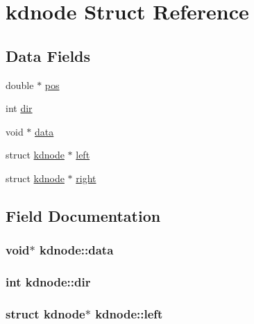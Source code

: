 \hypertarget{structkdnode}{}\section{kdnode Struct Reference}
\label{structkdnode}
\subsection*{Data Fields}
\begin{DoxyCompactItemize}
\item 
double $\ast$ \hyperlink{structkdnode_af92e7d95a2845d3e8611b289d6398a83}{pos}
\item 
int \hyperlink{structkdnode_aa3b02f2e7995f08cd16a85ea93e1fc80}{dir}
\item 
void $\ast$ \hyperlink{structkdnode_ac14038f51e15cb1bb26abe6558d36a3d}{data}
\item 
struct \hyperlink{structkdnode}{kdnode} $\ast$ \hyperlink{structkdnode_a5011f2e53a829b362c8d034f005e6a04}{left}
\item 
struct \hyperlink{structkdnode}{kdnode} $\ast$ \hyperlink{structkdnode_a560fdae1b98325057e95c817f76bee67}{right}
\end{DoxyCompactItemize}


\subsection{Field Documentation}
\hypertarget{structkdnode_ac14038f51e15cb1bb26abe6558d36a3d}{}
\subsubsection[{data}]{\setlength{\rightskip}{0pt plus 5cm}void$\ast$ kdnode\+::data}\label{structkdnode_ac14038f51e15cb1bb26abe6558d36a3d}
\hypertarget{structkdnode_aa3b02f2e7995f08cd16a85ea93e1fc80}{}
\subsubsection[{dir}]{\setlength{\rightskip}{0pt plus 5cm}int kdnode\+::dir}\label{structkdnode_aa3b02f2e7995f08cd16a85ea93e1fc80}
\hypertarget{structkdnode_a5011f2e53a829b362c8d034f005e6a04}{}
\subsubsection[{left}]{\setlength{\rightskip}{0pt plus 5cm}struct {\bf kdnode}$\ast$ kdnode\+::left}\label{structkdnode_a5011f2e53a829b362c8d034f005e6a04}
\hypertarget{structkdnode_af92e7d95a2845d3e8611b289d6398a83}{}
